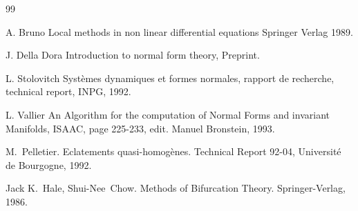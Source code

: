 \documentclass[11p,a4paper]{article}
\begin{document}
\begin{thebibliography}{99}

	A. Bruno {\sf Local methods in non linear differential equations}
	Springer Verlag 1989.

	J. Della Dora {\sf Introduction to normal form theory}, Preprint.

	L. Stolovitch {\sf Syst\`emes dynamiques et formes normales, rapport 
	de recherche}, technical report, INPG, 1992.

	L. Vallier {\sf An Algorithm for the computation of Normal Forms and 
	invariant Manifolds}, ISAAC, page 225-233, edit. Manuel Bronstein, 
	1993.

M.~Pelletier.
{\sf Eclatements quasi-homog\`enes.}
Technical Report 92-04, Universit\'e de Bourgogne, 1992.

Jack K.~Hale, Shui-Nee~Chow.
{\sf Methods of Bifurcation Theory}.
Springer-Verlag, 1986.

\end{thebibliography}
\end{document}
